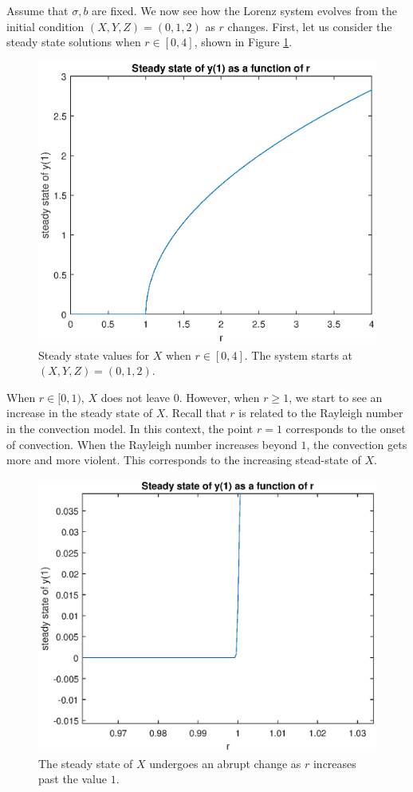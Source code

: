 \documentclass[twocolumn,amsmath,amssymb,aps]{revtex4}
\begin{document}
Assume that $\sigma,b$ are fixed. We now see how the Lorenz system evolves from the initial condition $(X,Y,Z) = (0, 1, 2)$ as $r$ changes. First, let us consider the steady state solutions when $r\in [0,4]$, shown in Figure \ref{fig:lorenz_2}.
\begin{figure}[!htb]
	\centering
	\includegraphics[scale=0.5]{bifurcation_sharp}
	\caption{Steady state values for $X$ when $r\in [0,4]$. The system starts at $(X,Y,Z) = (0,1,2)$.}
	\label{fig:lorenz_2}
\end{figure}


When $r \in [0,1)$, $X$ does not leave $0$. However, when $r \geq 1$, we start to see an increase in the steady state of $X$. Recall that $r$ is related to the Rayleigh number in the convection model. In this context, the point $r = 1$ corresponds to the onset of convection. When the Rayleigh number increases beyond $1$, the convection gets more and more violent. This corresponds to the increasing stead-state of $X$. 
\begin{figure}[!htb]
	\centering
	\includegraphics[scale=0.5]{bifurcation_sharp_corner}
	\caption{The steady state of $X$ undergoes an abrupt change as $r$ increases past the value $1$.}
	\label{fig:lorenz_3}
\end{figure}
\end{document}
